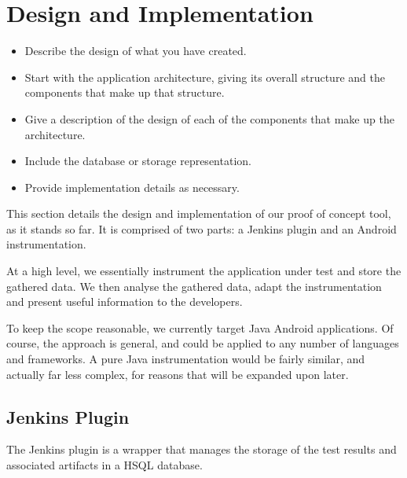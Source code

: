 \section{Design and Implementation}
\label{sec:imp}

\begin{mdframed}
	\begin{itemize}
		\item Describe the design of what you have created.
		\item Start with the application architecture, giving its overall structure and the components that make up that structure.
		\item Give a description of the design of each of the components that make up the architecture.
		\item Include the database or storage representation.
		\item Provide implementation details as necessary.
	\end{itemize}
\end{mdframed}


This section details the design and implementation of our proof of concept tool, as it stands so far. It is comprised of two parts: a Jenkins plugin and an Android instrumentation.

At a high level, we essentially instrument the application under test and store the gathered data. We then analyse the gathered data, adapt the instrumentation and present useful information to the developers.

To keep the scope reasonable, we currently target Java Android applications. Of course, the approach is general, and could be applied to any number of languages and frameworks. A pure Java instrumentation would be fairly similar, and actually far less complex, for reasons that will be expanded upon later.


\subsection{Jenkins Plugin}

The Jenkins plugin is a wrapper that manages the storage of the test results and associated artifacts in a HSQL database.


